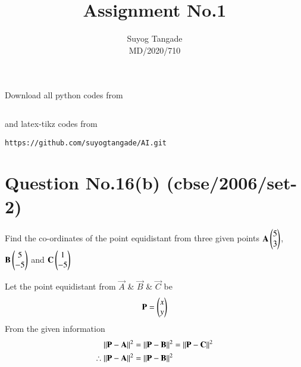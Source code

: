 \documentclass[journal,12pt,twocolumn]{IEEEtran}
\begin{document}
\def\rightbox#1{\makebox[0in][r]{#1}}
\def\centbox#1{\makebox[0in]{#1}}
\def\topbox#1{\raisebox{-\baselineskip}[0in][0in]{#1}}
\def\midbox#1{\raisebox{-0.5\baselineskip}[0in][0in]{#1}}
\vspace{3cm}
\title{Assignment No.1} 
\author{Suyog Tangade\\MD/2020/710} 
\maketitle
\newpage
\bigskip
\renewcommand{\thefigure}{\theenumi}
\renewcommand{\thetable}{\theenumi}
Download all python codes from
\begin{lstlisting}

\end{lstlisting}
%
and latex-tikz codes from
%
\begin{lstlisting}
https://github.com/suyogtangade/AI.git
\end{lstlisting}
%
\section{Question No.16(b) (cbse/2006/set-2)}

Find the co-ordinates of the point equidistant from three given points $\mathbf{A}\begin{pmatrix}5\\3\end{pmatrix}$, $\mathbf{B}\begin{pmatrix}5\\-5\end{pmatrix}$ and $\mathbf{C}\begin{pmatrix}1\\-5\end{pmatrix}$ 
\solution

Let the point equidistant from $\Vec{A}$ \& $\Vec{B}$ \& $\Vec{C}$ be 
\begin{align}
    \Vec{P}=\myvec{x\\y}
\end{align}
From the given information 
\begin{align}\label{eq:1}
    \norm{\Vec{P}-\vec{A}}^2 &= \norm{\vec{P}-\vec{B}}^2 = \norm{\vec{P}-\vec{C}}^2\\
\therefore
    \norm{\Vec{P}-\vec{A}}^2 &= \norm{\vec{P}-\vec{B}}^2
\end{align}
\end{document}
